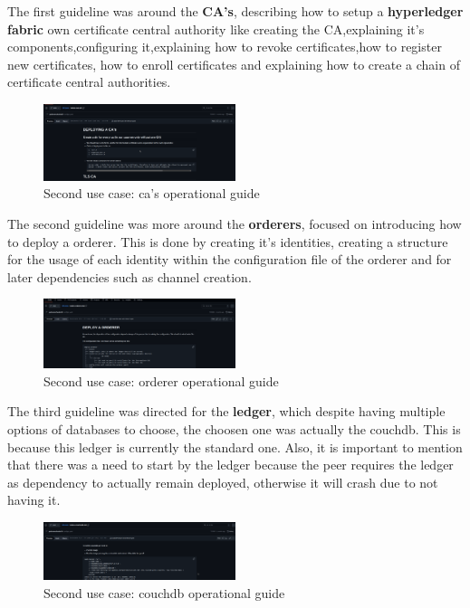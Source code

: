 The first guideline was around the \textbf{CA's}, describing how to setup a \textbf{hyperledger fabric} own certificate central authority like creating the CA,explaining it's components,configuring it,explaining how to revoke certificates,how to register new certificates, how to enroll certificates and explaining how to create a chain of certificate central authorities.

\begin{figure}[H]
    \centering
    \includegraphics[width=0.5\textwidth]{assets/use-case-2/notes-cas.png} %
    \caption{Second use case: ca's operational guide}
    \label{fig:sample-image} 
\end{figure}

The second guideline was more around the \textbf{orderers}, focused on introducing how to deploy a orderer. This is done by creating it's identities, creating a structure for the usage of each identity within the configuration file of the orderer and for later dependencies such as channel creation.

\begin{figure}[H]
    \centering
    \includegraphics[width=0.5\textwidth]{assets/use-case-2/notes-orderer.png} %
    \caption{Second use case: orderer operational guide}
    \label{fig:sample-image} 
\end{figure}

The third guideline was directed for the \textbf{ledger}, which despite having multiple options of databases to choose, the choosen one was actually the couchdb. This is because this ledger is currently the standard one. Also, it is important to mention that there was a need to start by the ledger because the peer requires the ledger as dependency to actually remain deployed, otherwise it will crash due to not having it.

\begin{figure}[H]
    \centering
    \includegraphics[width=0.5\textwidth]{assets/use-case-2/notes-couch.png} %
    \caption{Second use case: couchdb operational guide}
    \label{fig:sample-image} 
\end{figure}

